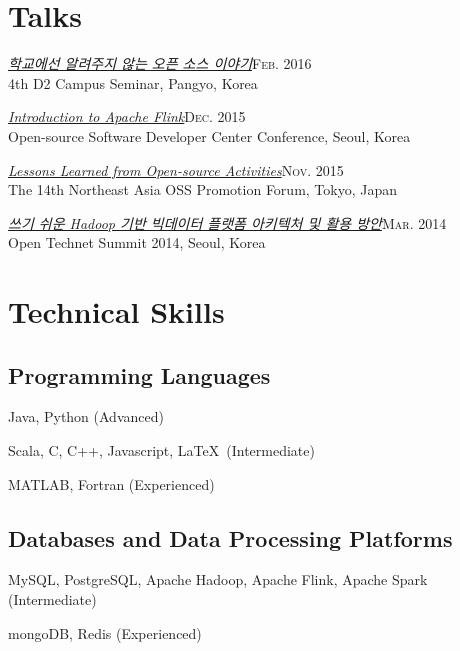 \documentclass[11pt,a4paper]{article}
\renewenvironment{itemize}{
  \begin{list}{}{
    \setlength{\leftmargin}{1.5em}
    \setlength{\itemsep}{0.5em}
    \setlength{\parskip}{0pt}
    \setlength{\parsep}{0.25em}
  }
}{
  \end{list}
}
\begin{document}
\section*{Talks}
\begin{itemize}
  \item \href{http://j.mp/d2-campus-seminar-4th-park}{\textit{학교에선 알려주지 않는 오픈 소스 이야기}}\hfill\textsc{Feb. 2016}\\
        4th D2 Campus Seminar, Pangyo, Korea
  \item \href{http://j.mp/ossdevconf-2015-park}{\textit{Introduction to Apache Flink}}\hfill\textsc{Dec. 2015}\\
        Open-source Software Developer Center Conference, Seoul, Korea
  \item \href{http://j.mp/cjkossforum-2015-park}{\textit{Lessons Learned from Open-source Activities}}\hfill\textsc{Nov. 2015}\\
        The 14th Northeast Asia OSS Promotion Forum, Tokyo, Japan
  \item \href{http://j.mp/ots-2014-park}{\textit{쓰기 쉬운 Hadoop 기반 빅데이터 플랫폼 아키텍처 및 활용 방안}}\hfill\textsc{Mar. 2014}\\
        Open Technet Summit 2014, Seoul, Korea
\end{itemize}

\section*{Technical Skills}
\subsection*{Programming Languages}
\begin{itemize}
  \setlength{\itemsep}{0.25em}
  \item Java, Python (Advanced)
  \item Scala, C, C++, Javascript, \LaTeX\ (Intermediate)
  \item MATLAB, Fortran (Experienced)
\end{itemize}
\subsection*{Databases and Data Processing Platforms}
\begin{itemize}
  \setlength{\itemsep}{0.25em}
  \item MySQL, PostgreSQL, Apache Hadoop, Apache Flink, Apache Spark (Intermediate)
  \item mongoDB, Redis (Experienced)
\end{itemize}
\end{document}
